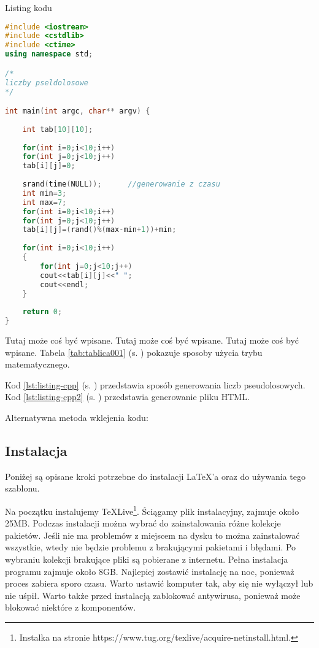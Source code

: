 
Listing kodu

\begin{lstlisting}[caption=Przykładowy kod 001, label={lst:listing-cpp}, language=C++]
#include <iostream>
#include <cstdlib>
#include <ctime>
using namespace std;

/*
liczby pseldolosowe
*/

int main(int argc, char** argv) {
	
	int tab[10][10];
	
	for(int i=0;i<10;i++)
	for(int j=0;j<10;j++)
	tab[i][j]=0;
	
	srand(time(NULL));		//generowanie z czasu
	int min=3;
	int max=7;
	for(int i=0;i<10;i++)
	for(int j=0;j<10;j++)		
	tab[i][j]=(rand()%(max-min+1))+min;	
	
	for(int i=0;i<10;i++)
	{
		for(int j=0;j<10;j++)
		cout<<tab[i][j]<<" ";	
		cout<<endl;
	}
	
	return 0;
}
\end{lstlisting}

Tutaj może coś być wpisane. Tutaj może coś być wpisane. Tutaj może coś być wpisane. Tabela \ref{tab:tablica001} (s. \pageref{tab:tablica001}) pokazuje sposoby użycia trybu matematycznego.

Kod \ref{lst:listing-cpp} (s. \pageref{lst:listing-cpp}) przedstawia sposób generowania liczb pseudolosowych. Kod \ref{lst:listing-cpp2} (s. \pageref{lst:listing-cpp2}) przedstawia generowanie pliku HTML.

Alternatywna metoda wklejenia kodu:




\subsection{Instalacja}  %

\hspace{0.60cm}Poniżej są opisane kroki potrzebne do instalacji \LaTeX 'a oraz do używania tego szablonu.

 Na początku instalujemy \TeX{}Live\footnote{Instalka na stronie  https://www.tug.org/texlive/acquire-netinstall.html\cite{www2}.}. Ściągamy plik instalacyjny, zajmuje około 25MB. Podczas instalacji można wybrać do zainstalowania różne kolekcje pakietów. Jeśli nie ma problemów z miejscem na dysku to można zainstalować wszystkie, wtedy nie będzie problemu z brakującymi pakietami i błędami. Po wybraniu kolekcji brakujące pliki są pobierane z internetu. Pełna instalacja programu zajmuje około 8GB. Najlepiej zostawić instalację na noc, ponieważ proces zabiera sporo czasu. Warto ustawić komputer tak, aby się nie wyłączył lub nie uśpił. Warto także przed instalacją zablokować antywirusa, ponieważ może blokować niektóre z komponentów.
 
